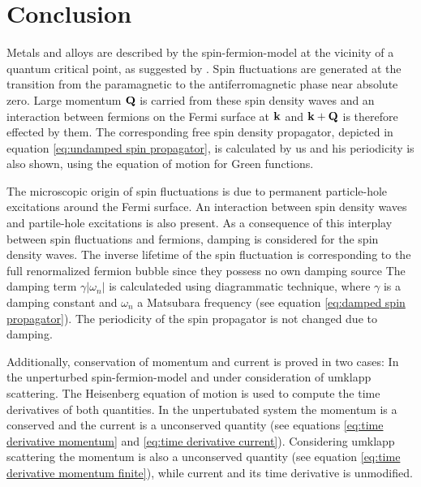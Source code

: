 %
%
\chapter{Conclusion}
\label{ch:conclusion}
%
%
Metals and alloys are described by the spin-fermion-model at the vicinity of a quantum critical point, as suggested by \cite{Abanov&Chubukov&Schmalian}.
Spin fluctuations are generated at the transition from the paramagnetic to the antiferromagnetic phase near absolute zero.
Large momentum $\vb{Q}$ is carried from these spin density waves and an interaction between fermions on the Fermi surface at $\vb{k}$ and $\vb{k}+\vb{Q}$ is therefore effected by them.
The corresponding free spin density propagator, depicted in equation \eqref{eq:undamped spin propagator}, is calculated by us and his periodicity is also shown, using the equation of motion for Green functions.

The microscopic origin of spin fluctuations is due to permanent particle-hole excitations around the Fermi surface.
An interaction between spin density waves and partile-hole excitations is also present.
As a consequence of this interplay between spin fluctuations and fermions, damping is considered for the spin density waves.
The inverse lifetime of the spin fluctuation is corresponding to the full renormalized fermion bubble since they possess no own damping source
The damping term $\gamma|\omega_{n}|$ is calculateded using diagrammatic technique, where $\gamma$ is a damping constant and $\omega_{n}$ a Matsubara frequency (see equation \eqref{eq:damped spin propagator}).
The periodicity of the spin propagator is not changed due to damping.

Additionally, conservation of momentum and current is proved in two cases: In the unperturbed spin-fermion-model and under consideration of umklapp scattering.
The Heisenberg equation of motion is used to compute the time derivatives of both quantities.
In the unpertubated system the momentum is a conserved and the current is a unconserved quantity (see equations \eqref{eq:time derivative momentum} and \eqref{eq:time derivative current}).
Considering umklapp scattering the momentum is also a unconserved quantity (see equation \eqref{eq:time derivative momentum finite}), while current and its time derivative is unmodified.

